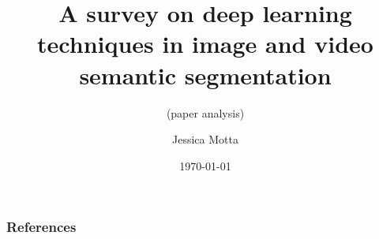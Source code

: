 \documentclass[aspectratio=169]{beamer} %
\title[DP in semantic segmentation]{A survey on deep learning techniques in image and video semantic segmentation}
\subtitle{(paper analysis)}
\date{\today}
\author[Jessica Motta]{Jessica Motta}
\institute[SENAI CIMATEC]{SENAI CIMATEC}
\begin{document}
\begin{frame}
  \titlepage
\end{frame}








    
    \begin{frame}[t, allowframebreaks]
        \frametitle{References}
        
        
    \end{frame}
\end{document}
